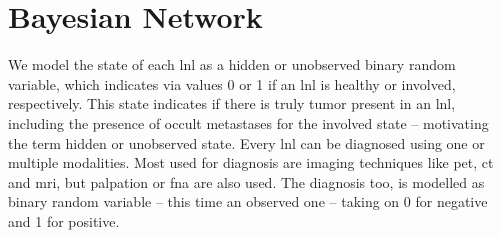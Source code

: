 \documentclass[\relativeRoot/main.tex]{subfiles}
\begin{document}
\section{Bayesian Network}
\label{sec:previous_work:bayesian_network}

We model the state of each \gls{lnl} as a hidden or unobserved binary random variable, which indicates via values 0 or 1 if an \gls{lnl} is healthy or involved, respectively. This state indicates if there is truly tumor present in an \gls{lnl}, including the presence of occult metastases for the involved state -- motivating the term hidden or unobserved state. Every \gls{lnl} can be diagnosed using one or multiple modalities. Most used for diagnosis are imaging techniques like \gls{pet}, \gls{ct} and \gls{mri}, but palpation or \gls{fna} are also used. The diagnosis too, is modelled as binary random variable -- this time an observed one -- taking on 0 for negative and 1 for positive.
\end{document}

